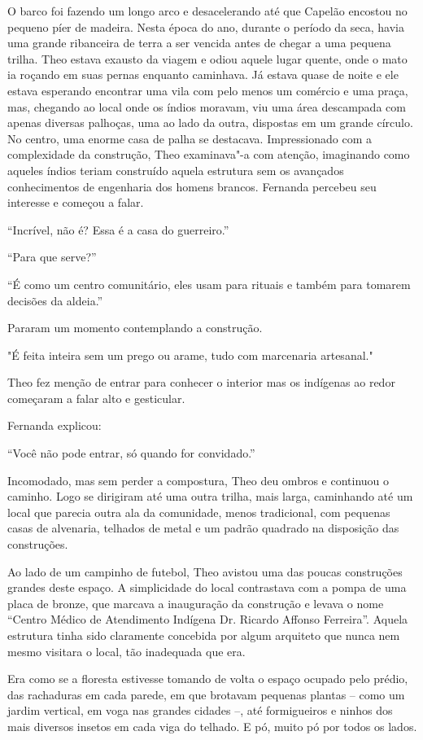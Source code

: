 O barco foi fazendo um longo arco e desacelerando até que Capelão
encostou no pequeno píer de madeira. Nesta época do ano, durante o
período da seca, havia uma grande ribanceira de terra a ser vencida
antes de chegar a uma pequena trilha. Theo estava exausto da viagem e
odiou aquele lugar quente, onde o mato ia roçando em suas pernas
enquanto caminhava. Já estava quase de noite e ele estava esperando
encontrar uma vila com pelo menos um comércio e uma praça, mas, chegando
ao local onde os índios moravam, viu uma área descampada com apenas
diversas palhoças, uma ao lado da outra, dispostas em um grande círculo.
No centro, uma enorme casa de palha se destacava. Impressionado com a
complexidade da construção, Theo examinava"-a com atenção, imaginando
como aqueles índios teriam construído aquela estrutura sem os avançados
conhecimentos de engenharia dos homens brancos. Fernanda percebeu seu
interesse e começou a falar.

``Incrível, não é? Essa é a casa do guerreiro.''

``Para que serve?''

``É como um centro comunitário, eles usam para rituais e também para
tomarem decisões da aldeia.''

Pararam um momento contemplando a construção.

"É feita inteira sem um prego ou arame, tudo com marcenaria artesanal."

Theo fez menção de entrar para conhecer o interior mas os indígenas ao
redor começaram a falar alto e gesticular.

Fernanda explicou:

``Você não pode entrar, só quando for convidado.''

Incomodado, mas sem perder a compostura, Theo deu ombros e continuou o
caminho. Logo se dirigiram até uma outra trilha, mais larga, caminhando
até um local que parecia outra ala da comunidade, menos tradicional, com
pequenas casas de alvenaria, telhados de metal e um padrão quadrado na
disposição das construções.

Ao lado de um campinho de futebol, Theo avistou uma das poucas
construções grandes deste espaço. A simplicidade do local contrastava
com a pompa de uma placa de bronze, que marcava a inauguração da
construção e levava o nome ``Centro Médico de Atendimento Indígena Dr.
Ricardo Affonso Ferreira''. Aquela estrutura tinha sido claramente
concebida por algum arquiteto que nunca nem mesmo visitara o local, tão
inadequada que era.

Era como se a floresta estivesse tomando de volta o espaço ocupado pelo
prédio, das rachaduras em cada parede, em que brotavam pequenas plantas -- como
um jardim vertical, em voga nas grandes
cidades --, até formigueiros e ninhos dos mais diversos insetos em cada viga do
telhado. E pó, muito pó por todos os lados.

